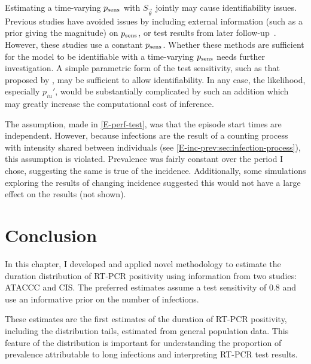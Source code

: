 \documentclass[thesis.tex]{subfiles}
\begin{document}
Estimating a time-varying $p_\text{sens}$ with $S_{\vec{\theta}}$ jointly may cause identifiability issues.
Previous studies have avoided issues by including external information (such as a prior giving the magnitude) on $p_\text{sens}$, or test results from later follow-up~\autocite[and references therein]{piresIntervalMisclassify}.
However, these studies use a constant $p_\text{sens}$.
Whether these methods are sufficient for the model to be identifiable with a time-varying $p_\text{sens}$ needs further investigation.
A simple parametric form of the test sensitivity, such as that proposed by \textcite{brownBayesian}, may be sufficient to allow identifiability.
In any case, the likelihood, especially $p_{iu}'$, would be substantially complicated by such an addition which may greatly increase the computational cost of inference.

The assumption, made in \cref{E-perf-test}, was that the episode start times are independent.
However, because infections are the result of a counting process with intensity shared between individuals (see \cref{E-inc-prev:sec:infection-process}), this assumption is violated.
Prevalence was fairly constant over the period I chose, suggesting the same is true of the incidence.
Additionally, some simulations exploring the results of changing incidence suggested this would not have a large effect on the results (not shown).


\section{Conclusion} \label{imperf-test:sec:conclusion}

In this chapter, I developed and applied novel methodology to estimate the duration distribution of RT-PCR positivity using information from two studies: ATACCC and CIS.
The preferred estimates assume a test sensitivity of 0.8 and use an informative prior on the number of infections.

These estimates are the first estimates of the duration of RT-PCR positivity, including the distribution tails, estimated from general population data.
This feature of the distribution is important for understanding the proportion of prevalence attributable to long infections and interpreting RT-PCR test results.
\end{document}
